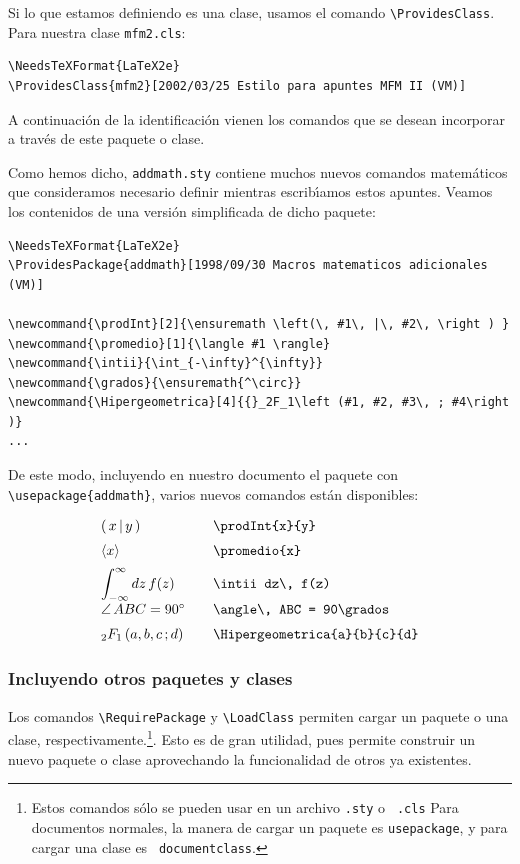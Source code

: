 {Si lo que estamos definiendo es una clase, usamos el comando
\verb+\ProvidesClass+. Para nuestra clase \verb+mfm2.cls+: 
\begin{verbatim}
\NeedsTeXFormat{LaTeX2e}
\ProvidesClass{mfm2}[2002/03/25 Estilo para apuntes MFM II (VM)]
\end{verbatim}

A continuaci\'on de la identificaci\'on vienen los comandos que
se desean incorporar a trav\'es de este paquete o clase. 

Como hemos dicho, \verb+addmath.sty+ contiene muchos nuevos comandos
matem\'aticos que consideramos necesario definir mientras
escrib\'{\i}amos estos apuntes. Veamos los contenidos de una versi\'on
simplificada de dicho paquete:
\begin{verbatim}
\NeedsTeXFormat{LaTeX2e}
\ProvidesPackage{addmath}[1998/09/30 Macros matematicos adicionales (VM)]

\newcommand{\prodInt}[2]{\ensuremath \left(\, #1\, |\, #2\, \right ) }
\newcommand{\promedio}[1]{\langle #1 \rangle}
\newcommand{\intii}{\int_{-\infty}^{\infty}}
\newcommand{\grados}{\ensuremath{^\circ}}
\newcommand{\Hipergeometrica}[4]{{}_2F_1\left (#1, #2, #3\, ; #4\right )}
...
\end{verbatim}

De este modo, incluyendo en nuestro documento el paquete con
\verb+\usepackage{addmath}+, varios nuevos comandos est\'an
disponibles:

$$
\begin{array}{lcl}
 \prodInt{x}{y}&&\mbox{\tt \bslash prodInt\{x\}\{y\}}  \\[.2cm]
 \promedio{x} &&\mbox{\tt \bslash promedio\{x\}}   \\[.2cm]
\displaystyle \intii dz\, f(z)&&\mbox{\tt \bslash intii dz\bslash, f(z)} \\[.2cm]
\angle\, ABC = 90\grados && \mbox{\tt \bslash angle\bslash, 
ABC = 90\bslash grados}\\[.2cm]
\Hipergeometrica{a}{b}{c}{d} &&\mbox{\tt \bslash Hipergeometrica\{a\}\{b\}\{c\}\{d\}} 
\end{array}
$$

\subsubsection{Incluyendo otros paquetes y clases}

Los comandos \verb+\RequirePackage+ y \verb+\LoadClass+ permiten
cargar un paquete o una clase, respectivamente.\footnote{Estos
  comandos s\'olo se pueden usar en un archivo {\tt .sty} o {\tt
    .cls} Para documentos normales, la manera de cargar un paquete es
  {\tt \bslash usepackage}, y para cargar una clase es {\tt \bslash
    documentclass}.}. Esto es de gran utilidad, pues permite construir
un nuevo paquete o clase aprovechando la funcionalidad de otros ya
existentes. 

}
